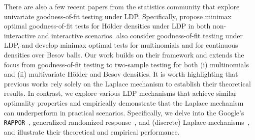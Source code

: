 \documentclass[twoside,11pt]{article}
\begin{document}
There are also a few recent papers from the statistics community that explore univariate goodness-of-fit testing under LDP. Specifically, \citet{Dubois2022} propose minimax optimal goodness-of-fit tests for H\"{o}lder densities under LDP in both non-interactive and interactive scenarios. \citet{Lam-Weil2021MinimaxConstraint} also consider goodness-of-fit testing under LDP, and develop minimax optimal tests for multinomials and for continuous densities over Besov balls. Our work builds on their framework and extends the focus from goodness-of-fit testing to two-sample testing for both (i) multinomials and (ii) multivariate H\"{o}lder and Besov densities. It is worth highlighting that previous works \citep{Lam-Weil2021MinimaxConstraint, Dubois2022} rely  solely on the Laplace mechanism \citep{Dwork2014Book} to establish their theoretical results. In contrast, we explore various LDP mechanisms that achieve similar optimality properties and empirically demonstrate that the Laplace mechanism can underperform in practical scenarios. Specifically, we delve into the Google's \texttt{RAPPOR}~\cite{Gaboardi2018LDPChisq, erlingsson_rappor_2014, acharya_test_2019}, generalized randomized response~\citep{Gaboardi2018LDPChisq}, and (discrete) Laplace mechanisms~\citep{ghosh2009}, and illustrate their theoretical and empirical performance.
\end{document}
